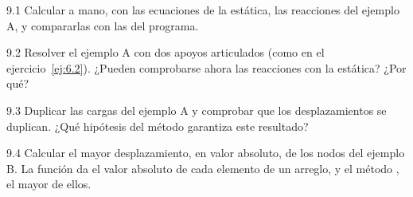 \ejercicios

\begin{ejercicio}{9.1}
Calcular a mano, con las ecuaciones de la estática, las reacciones del
ejemplo A, y compararlas con las del programa.
\end{ejercicio}

\begin{ejercicio}{9.2}
Resolver el ejemplo A con dos apoyos articulados (como en el
ejercicio~\ref{ej:6.2}). ¿Pueden comprobarse ahora las reacciones con la
estática? ¿Por qué?
\end{ejercicio}

\begin{ejercicio}{9.3}
Duplicar las cargas del ejemplo A y comprobar que los desplazamientos se
duplican. ¿Qué hipótesis del método garantiza este resultado?
\end{ejercicio}

\begin{ejercicio}{9.4}
Calcular el mayor desplazamiento, en valor absoluto, de los nodos del
ejemplo B. La función  da el valor absoluto de cada elemento de un
arreglo, y el método , el mayor de ellos.
\end{ejercicio}

